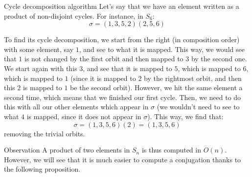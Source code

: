 \documentclass[a4paper]{article}
\begin{document}
\begin{parag}{Cycle decomposition algorithm}
    Let's say that we have an element written as a product of non-disjoint cycles. For instance, in $S_6$: 
    \[\sigma = \left(1, 3, 5, 2\right) \left(2, 5, 6\right)\]
    
    To find its cycle decomposition, we start from the right (in composition order) with some element, say $1$, and see to what it is mapped. This way, we would see that $1$ is not changed by the first orbit and then mapped to $3$ by the second one. We start again with this $3$, and see that it is mapped to $5$, which is mapped to $6$, which is mapped to $1$ (since it is mapped to $2$ by the rightmost orbit, and then this $2$ is mapped to $1$ be the second orbit). However, we hit the same element a second time, which means that we finished our first cycle. Then, we need to do this with all our other elements which appear in $\sigma$ (we wouldn't need to see to what $4$ is mapped, since it does not appear in $\sigma$). This way, we find that: 
    \[\sigma = \left(1, 3, 5, 6\right)\left(2\right) = \left(1, 3, 5, 6\right)\]
    removing the trivial orbits.

    \begin{subparag}{Observation}
        A product of two elements in $S_n$ is thus computed in $O\left(n\right)$. However, we will see that it is much easier to compute a conjugation thanks to the following proposition.
    \end{subparag}
\end{parag}
\end{document}
